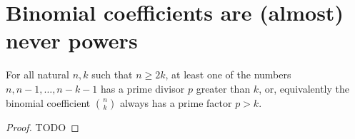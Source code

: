 \chapter{Binomial coefficients are (almost) never powers}


\begin{theorem}
    \label{sylvester}
    \leanok
    For all natural \(n, k\) such that \(n \ge 2k\), at least one of the numbers
    \(n, n - 1, \dots, n - k - 1\) has a prime divisor $p$ greater than $k$,
    or, equivalently the binomial coefficient
    \(\binom{n}{k}\) always has a prime factor \(p > k\).
\end{theorem}
\begin{proof}
    TODO
\end{proof}


